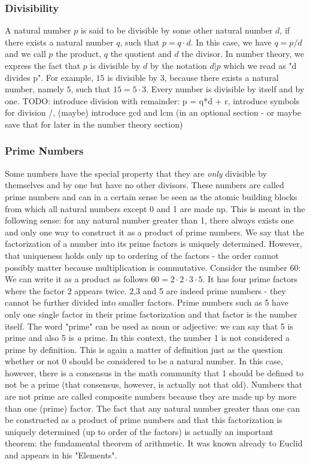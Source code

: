\subsubsection{Divisibility}
A natural number $p$ is said to be divisible by some other natural number $d$, if there exists a natural number $q$, such that $p = q \cdot d$. In this case, we have $q = p/d$ and we call $p$ the product, $q$ the quotient and $d$ the divisor. In number theory, we express the fact that $p$ is divisible by $d$ by the notation $d | p$ which we read as "d divides p". For example, $15$ is divisible by $3$, because there exists a natural number, namely $5$, such that $15 = 5 \cdot 3$. Every number is divisible by itself and by one. TODO: introduce division with remainder: p = q*d + r, introduce symbols for division /, (maybe) introduce gcd and lcm (in an optional section - or maybe save that for later in the number theory section)


\subsubsection{Prime Numbers}
Some numbers have the special property that they are \emph{only} divisible by themselves and by one but have no other divisors. These numbers are called prime numbers and can in a certain sense be seen as the atomic building blocks from which all natural numbers except 0 and 1 are made up. This is meant in the following sense: for any natural number greater than 1, there always exists one and only one way to construct it as a product of prime numbers. We say that the factorization of a number into its prime factors is uniquely determined. However, that uniqueness holds only up to ordering of the factors - the order cannot possibly matter because multiplication is commutative. Consider the number 60: We can write it as a product as follows $60 = 2 \cdot 2 \cdot 3 \cdot 5$. It has four prime factors where the factor 2 appears twice. 2,3 and 5 are indeed prime numbers - they cannot be further divided into smaller factors. Prime numbers such as 5 have only one single factor in their prime factorization and that factor is the number itself. The word "prime" can be used as noun or adjective: we can say that 5 is prime and also 5 is \emph{a} prime. In this context, the number 1 is not considered a prime by definition. This is again a matter of definition just as the question whether or not 0 should be considered to be a natural number. In this case, however, there is a consensus in the math community that 1 should be defined to not be a prime (that consensus, however, is actually not that old). Numbers that are not prime are called composite numbers because they are made up by more than one (prime) factor. The fact that any natural number greater than one can be constructed as a product of prime numbers and that this factorization is uniquely determined (up to order of the factors) is actually an important theorem: the fundamental theorem of arithmetic. It was known already to Euclid and appears in his "Elements".

